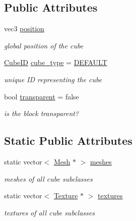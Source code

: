 \subsection*{Public Attributes}
\begin{DoxyCompactItemize}
\item 
vec3 \mbox{\hyperlink{classCube_a9b495ef759214f35fcc7f466ebfa64a9}{position}}
\begin{DoxyCompactList}\small\item\em global position of the cube \end{DoxyCompactList}\item 
\mbox{\hyperlink{Cube_8hpp_ae2a13060ddab6f6437cc4d66a1f7c370}{Cube\+ID}} \mbox{\hyperlink{classCube_a4c15451eb6d1f99fd08f1f840aa8cec7}{cube\+\_\+type}} = \mbox{\hyperlink{Cube_8hpp_ae2a13060ddab6f6437cc4d66a1f7c370a88ec7d5086d2469ba843c7fcceade8a6}{D\+E\+F\+A\+U\+LT}}
\begin{DoxyCompactList}\small\item\em unique ID representing the cube \end{DoxyCompactList}\item 
bool \mbox{\hyperlink{classCube_ac7eda995b98581564cb8dbe3ccc9369d}{transparent}} = false
\begin{DoxyCompactList}\small\item\em is the block transparent? \end{DoxyCompactList}\end{DoxyCompactItemize}
\subsection*{Static Public Attributes}
\begin{DoxyCompactItemize}
\item 
static vector$<$ \mbox{\hyperlink{structMesh}{Mesh}} $\ast$ $>$ \mbox{\hyperlink{classCube_a4470b28c7fff28dd9058ea96307c1000}{meshes}}
\begin{DoxyCompactList}\small\item\em meshes of all cube subclasses \end{DoxyCompactList}\item 
static vector$<$ \mbox{\hyperlink{classTexture}{Texture}} $\ast$ $>$ \mbox{\hyperlink{classCube_a7c3516e41ce365ccad2d9bb9ed81ff10}{textures}}
\begin{DoxyCompactList}\small\item\em textures of all cube subclasses \end{DoxyCompactList}\end{DoxyCompactItemize}



